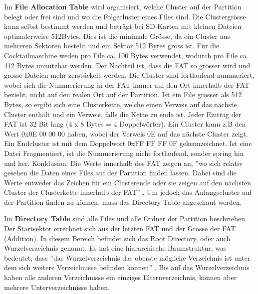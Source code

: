 Im \textbf{File Allocation Table} wird organisiert, welche Cluster auf der Partition belegt oder frei sind und wo die Folgecluster eines Files sind. Die Clustergrösse kann selbst bestimmt werden und beträgt bei SD-Karten mit kleinen Dateien optimalerweise 512Bytes. Dies ist die minimale Grösse, da ein Cluster aus mehreren Sektoren besteht und ein Sektor 512 Bytes gross ist. Für die Cocktailmaschine weden pro File ca. 100 Bytes verwendet, wodurch pro File ca. 412 Bytes unnutzbar werden. Der Nachteil ist, dass die FAT so grösser wird und grosse Dateien mehr zerstückelt werden. Die Cluster sind fortlaufend nummeriert, wobei sich die Nummerierung in der FAT immer auf den Ort innerhalb der FAT bezieht, nicht auf den realen Ort auf der Partition. Ist ein File grösser als 512 Bytes, so ergibt sich eine Clusterkette, welche einen Verweis auf das nächste Cluster enthält und ein Verweis, falls die Kette zu ende ist. Jeder Eintrag der FAT ist 32 Bit lang (4 x 8 Bytes = 4 Doppelwörter). Ein Cluster kann z.B den Wert 0x0E 00 00 00 haben, wobei der Verweis 0E auf das nächste Cluster zeigt. Ein Endcluster ist mit dem Doppelwort 0xFF FF FF 0F gekennzeichnet. Ist eine Datei Fragmentiert, ist die Nummerierung nicht fortlaufend, sonder spring hin und her. Konklusion: Die Werte innerhalb des FAT zeigen an, ''wo sich relativ gesehen die Daten eines Files auf der Partition finden lassen. Dabei sind die Werte entweder das Zeichen für ein Clusterende oder sie zeigen auf den nächsten Cluster der Clusterkette innerhalb der FAT'' . Um jedoch das Anfangscluster auf der Partition finden zu können, muss das Directory Table angeschaut werden.

\newpage

Im \textbf{Directory Table} sind alle Files und alle Ordner der Partition beschrieben. Der Startsektor errechnet sich aus der letzten FAT und der Grösse der FAT (Addition). In diesem Bereich befindet sich das Root Directory, oder auch Wurzelverzeichnis genannt. Es hat eine hiararchische Baumstruktur, was bedeutet, dass ''das Wurzelverzeichnis das oberste mögliche Verzeichnis ist unter dem sich weitere Verzeichnisse befinden können'' . Bis auf das Wurzelverzeichnis haben alle anderen Verzeichnisse ein einziges Elternverzeichnis, können aber mehrere Unterverzeichnisse haben.


